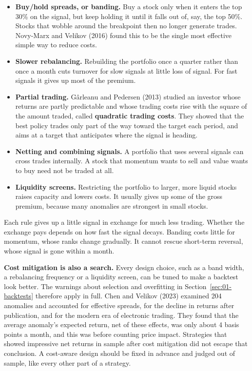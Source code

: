 \begin{itemize}
  \item \textbf{Buy/hold spreads, or banding.} Buy a stock only when it enters the top 30\% on the signal, but keep holding it until it falls out of, say, the top 50\%. Stocks that wobble around the breakpoint then no longer generate trades. Novy-Marx and Velikov (2016) found this to be the single most effective simple way to reduce costs.
  \item \textbf{Slower rebalancing.} Rebuilding the portfolio once a quarter rather than once a month cuts turnover for slow signals at little loss of signal. For fast signals it gives up most of the premium.
  \item \textbf{Partial trading.} G\^arleanu and Pedersen (2013) studied an investor whose returns are partly predictable and whose trading costs rise with the square of the amount traded, called \textbf{quadratic trading costs}. They showed that the best policy trades only part of the way toward the target each period, and aims at a target that anticipates where the signal is heading.
  \item \textbf{Netting and combining signals.} A portfolio that uses several signals can cross trades internally. A stock that momentum wants to sell and value wants to buy need not be traded at all.
  \item \textbf{Liquidity screens.} Restricting the portfolio to larger, more liquid stocks raises capacity and lowers costs. It usually gives up some of the gross premium, because many anomalies are strongest in small stocks.
\end{itemize}

Each rule gives up a little signal in exchange for much less trading. Whether the exchange pays depends on how fast the signal decays. Banding costs little for momentum, whose ranks change gradually. It cannot rescue short-term reversal, whose signal is gone within a month.

\textbf{Cost mitigation is also a search.} Every design choice, such as a band width, a rebalancing frequency or a liquidity screen, can be tuned to make a backtest look better. The warnings about selection and overfitting in Section~\ref{sec:01-backtests} therefore apply in full. Chen and Velikov (2023) examined 204 anomalies and accounted for effective spreads, for the decline in returns after publication, and for the modern era of electronic trading. They found that the average anomaly's expected return, net of these effects, was only about 4 basis points a month, and this was before counting price impact. Strategies that showed impressive net returns in sample after cost mitigation did not escape that conclusion. A cost-aware design should be fixed in advance and judged out of sample, like every other part of a strategy.

